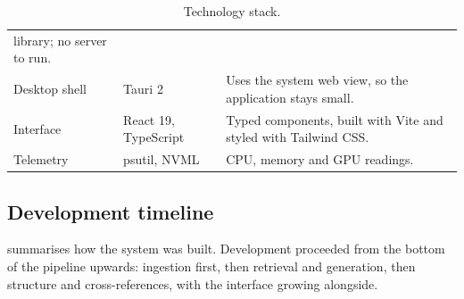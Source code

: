 \begin{table}[ht]
\begin{tabularx}{\textwidth}{@{}llX@{}}
                                             library; no server to run. \\
Desktop shell   & Tauri 2                  & Uses the system web view, so the
                                             application stays small. \\
Interface       & React 19, TypeScript     & Typed components, built with Vite
                                             and styled with Tailwind CSS. \\
Telemetry       & psutil, NVML             & CPU, memory and GPU readings. \\
\bottomrule
\end{tabularx}
\caption{Technology stack.}
\label{tab:stack}
\end{table}

\subsection{Development timeline}

 summarises how the system was built. Development
proceeded from the bottom of the pipeline upwards: ingestion first, then
retrieval and generation, then structure and cross-references, with the
interface growing alongside.

